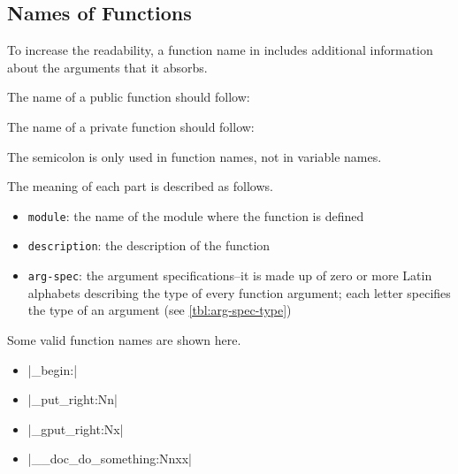 \documentclass{ltugboat}
\begin{document}
\subsection{Names of Functions}

To increase the readability, a function name in \LTT{} includes additional information about the arguments that it absorbs. 

\vspace*{0.5\baselineskip}
\par\noindent
The name of a public \LTT{} function should follow:
\begin{center}
\end{center}
The name of a private \LTT{} function should follow:
\begin{center}
\end{center}
The semicolon is only used in \LTT{} function names, not in variable names.

\vspace*{0.5\baselineskip}
\par\noindent
The meaning of each part is described as follows.
\begin{itemize}
\item \texttt{module}: the name of the module where the function is defined
\item \texttt{description}: the description of the function
\item \texttt{arg-spec}: the argument specifications--it is made up of zero or more Latin alphabets describing the type of every function argument; each letter specifies the type of an argument (see \cref{tbl:arg-spec-type})
\end{itemize}
Some valid function names are shown here.
\begin{itemize}
\item \inltex|\group_begin:|
\item \inltex|\tl_put_right:Nn|
\item \inltex|\tl_gput_right:Nx|
\item \inltex|\__doc_do_something:Nnxx|
\end{itemize}
\end{document}

